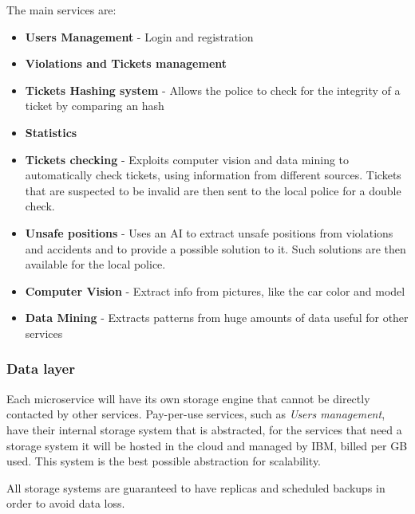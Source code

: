 The main services are:
\begin{itemize}
	\item \textbf{Users Management} - Login and registration
	\item \textbf{Violations and Tickets management}
	\item \textbf{Tickets Hashing system} - Allows the police to check for the integrity of a ticket by comparing an hash
	\item \textbf{Statistics}
	\item \textbf{Tickets checking} - Exploits computer vision and data mining to automatically check tickets, using information from different sources. Tickets that are suspected to be invalid are then sent to the local police for a double check.
	\item \textbf{Unsafe positions} - Uses an AI to extract unsafe positions from violations and accidents and to provide a possible solution to it. Such solutions are then available for the local police.
	\item \textbf{Computer Vision} - Extract info from pictures, like the car color and model
	\item \textbf{Data Mining} - Extracts patterns from huge amounts of data useful for other services
\end{itemize}

\subsubsection{Data layer}\label{datalayer}
Each microservice will have its own storage engine that cannot be directly contacted by other services. Pay-per-use services, such as \textit{Users management}, have their internal storage system that is abstracted,
for the services that need a storage system it will be hosted in the cloud and managed by IBM, billed per GB used. This system is the best possible abstraction for scalability.

All storage systems are guaranteed to have replicas and scheduled backups in order to avoid data loss.